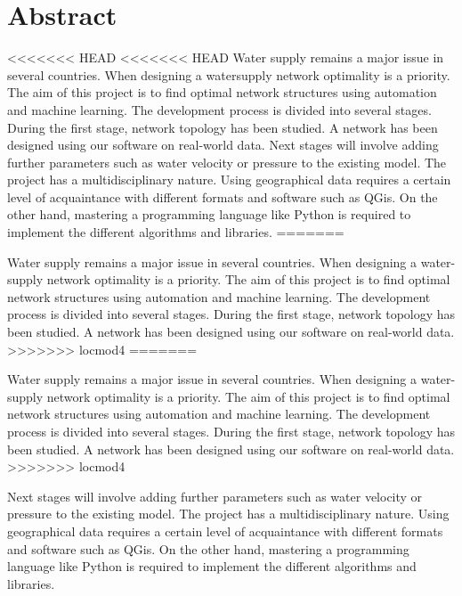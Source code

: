 ﻿\newpage
\chapter*{Abstract}


<<<<<<< HEAD
<<<<<<< HEAD
Water supply remains a major issue in several countries. When designing a watersupply
network optimality is a priority. The aim of this project is to find optimal network
structures using automation and machine learning.
The development process is divided into several stages. During the first stage, network
topology has been studied. A network has been designed using our software on real-world
data. Next stages will involve adding further parameters such as water velocity or pressure
to the existing model.
The project has a multidisciplinary nature. Using geographical data requires a certain level
of acquaintance with different formats and software such as QGis. On the other hand,
mastering a programming language like Python is required to implement the different
algorithms and libraries.
=======

Water supply remains a major issue in several countries. When designing a water-supply network optimality is a priority. The aim of this project is to find optimal network structures using automation and machine learning. The development process is divided into several stages. During the first stage, network topology has been studied. A network has been designed using our software on real-world data. 
>>>>>>> locmod4
=======

Water supply remains a major issue in several countries. When designing a water-supply network optimality is a priority. The aim of this project is to find optimal network structures using automation and machine learning. The development process is divided into several stages. During the first stage, network topology has been studied. A network has been designed using our software on real-world data. 
>>>>>>> locmod4

\vspace{0.5cm}
\noindent Next stages will involve adding further parameters such as water velocity or pressure to the existing model. The project has a multidisciplinary nature. Using geographical data requires a certain level of acquaintance with different formats and software such as QGis. On the other hand, mastering a programming language like Python is required to implement the different algorithms and libraries.